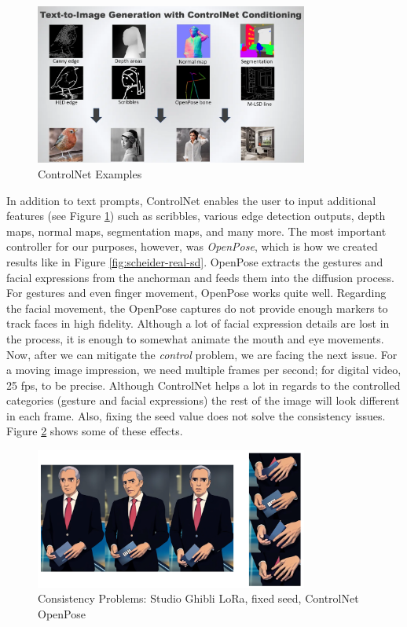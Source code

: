 \documentclass[
  a4paper,  %
  twoside,  %
  bibliography=totoc,
  headsepline,
  cleardoublepage=empty,
  parskip=half,
  draft=false
]{scrbook}
\begin{document}
\begin{figure}[h]
  \centering
  \includegraphics[width=0.8\textwidth]{./graphics/diffusion/ControlNet.png}
  \caption{ControlNet Examples \cite{foongIntroductionControlNetStable2023}}
  \label{fig:ControlNet}
\end{figure}

In addition to text prompts, ControlNet enables the user to input additional features (see Figure \ref{fig:ControlNet}) such as scribbles, various edge detection outputs, depth maps, normal maps, segmentation maps, and many more. The most important controller for our purposes, however, was \textit{OpenPose}, which is how we created results like in Figure \ref{fig:scheider-real-sd}. OpenPose extracts the gestures and facial expressions from the anchorman and feeds them into the diffusion process. For gestures and even finger movement, OpenPose works quite well. Regarding the facial movement, the OpenPose captures do not provide enough markers to track faces in high fidelity. Although a lot of facial expression details are lost in the process, it is enough to somewhat animate the mouth and eye movements.
Now, after we can mitigate the \textit{control} problem, we are facing the next issue. For a moving image impression, we need multiple frames per second; for digital video, 25 \gls{fps}, to be precise. Although ControlNet helps a lot in regards to the controlled categories (gesture and facial expressions) the rest of the image will look different in each frame. Also, fixing the seed value does not solve the consistency issues. Figure \ref{fig:controlnet-issues} shows some of these effects.

\begin{figure}[h]
  \centering
  \includegraphics[width=0.8\textwidth]{./graphics/diffusion/ControlNet-issues.png}
  \caption{Consistency Problems: Studio Ghibli LoRa, fixed seed, ControlNet OpenPose}
  \label{fig:controlnet-issues}
\end{figure}
\end{document}
